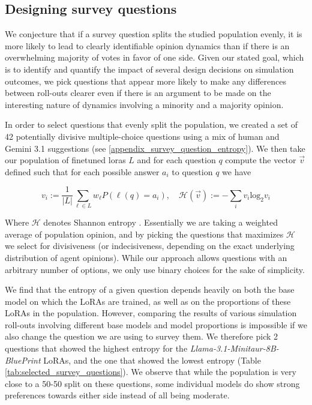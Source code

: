 \documentclass{article} %
\begin{document}
\subsection{Designing survey questions}
\label{appendix_designing_survey_questions}

We conjecture that if a survey question splits the studied population evenly, it is more likely to lead to clearly identifiable opinion dynamics than if there is an overwhelming majority of votes in favor of one side. Given our stated goal, which is to identify and quantify the impact of several design decisions on simulation outcomes, we pick questions that appear more likely to make any differences between roll-outs clearer even if there is an argument to be made on the interesting nature of dynamics involving a minority and a majority opinion.

In order to select questions that evenly split the population, we created a set of 42 potentially divisive multiple-choice questions using a mix of human and Gemini 3.1 suggestions (see \ref{appendix_survey_question_entropy}). We then take our population of finetuned loras $L$ and for each question $q$ compute the vector $\vec{v}$ defined such that for each possible answer $a_i$ to question $q$ we have

$$
v_i:=\frac{1}{|L|}\sum_{\ell\in L}w_{\ell}P(\ell(q)=a_i), \quad \mathcal{H}(\vec{v}):=-\sum_{i}v_i\operatorname{log_2}v_i
$$

Where $\mathcal{H}$ denotes Shannon entropy \citep{bromiley2004shannon}. Essentially we are taking a weighted average of population opinion, and by picking the questions that maximizes $\mathcal{H}$ we select for divisiveness (or indecisiveness, depending on the exact underlying distribution of agent opinions). While our approach allows questions with an arbitrary number of options, we only use binary choices for the sake of simplicity.

We find that the entropy of a given question depends heavily on both the base model on which the LoRAs are trained, as well as on the proportions of these LoRAs in the population. However, comparing the results of various simulation roll-outs involving different base models and model proportions is impossible if we also change the question we are using to survey them. We therefore pick 2 questions that showed the highest entropy for the \textit{Llama-3.1-Minitaur-8B-BluePrint} LoRAs, and the one that showed the lowest entropy (Table \ref{tab:selected_survey_questions}). We observe that while the population is very close to a 50-50 split on these questions, some individual models do show strong preferences towards either side instead of all being moderate.
\end{document}
